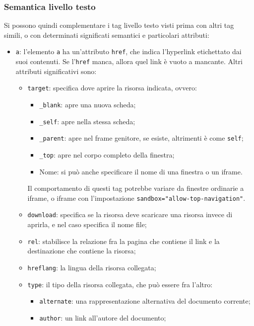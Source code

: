\documentclass[a4paper,11pt]{article}
\begin{document}
\subsubsection{Semantica livello testo}
Si possono quindi complementare i tag livello testo visti prima con altri tag simili, o con determinati significati semantici e particolari attributi:

\begin{itemize}
	\item \lstinline|a|: l'elemento \lstinline|a| ha un'attributo \lstinline|href|, che indica l'hyperlink etichettato dai suoi contenuti.
		Se l'\lstinline|href| manca, allora quel link è vuoto a mancante.
		Altri attributi significativi sono:
		\begin{itemize}
			\item \lstinline|target|: specifica dove aprire la risorsa indicata, ovvero:
				\begin{itemize}
					\item \lstinline|_blank|: apre una nuova scheda;
					\item \lstinline|_self|: apre nella stessa scheda;
					\item \lstinline|_parent|: apre nel frame genitore, se esiste, altrimenti è come \lstinline|self|;
					\item \lstinline|_top|: apre nel corpo completo della finestra;
					\item Nome: si può anche specificare il nome di una finestra o un iframe.
				\end{itemize}
Il comportamento di questi tag potrebbe variare da finestre ordinarie a iframe, o iframe con l'impostazione \lstinline|sandbox="allow-top-navigation"|.
			\item \lstinline|download|: specifica se la risorsa deve scaricare una risorsa invece di aprirla, e nel caso specifica il nome file;
			\item \lstinline|rel|: stabilisce la relazione fra la pagina che contiene il link e la destinazione che contiene la risorsa;
			\item \lstinline|hreflang|: la lingua della risorsa collegata;
			\item \lstinline|type|: il tipo della risorsa collegata, che può essere fra l'altro:
				\begin{itemize}
					\item \lstinline|alternate|: una rappresentazione alternativa del documento corrente;
					\item \lstinline|author|: un link all'autore del documento;

\end{itemize}
\end{itemize}
\end{itemize}
\end{document}
